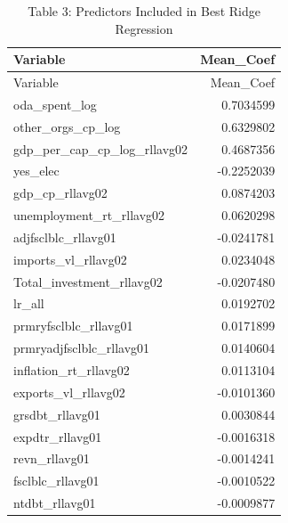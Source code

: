 \documentclass[
]{article}
\begin{document}
\begin{longtable}[]{@{}lr@{}}
\caption{Table 3: Predictors Included in Best Ridge
Regression}\tabularnewline
\toprule\noalign{}
Variable & Mean\_Coef \\
\midrule\noalign{}
\endfirsthead
\toprule\noalign{}
Variable & Mean\_Coef \\
\midrule\noalign{}
\endhead
\bottomrule\noalign{}
\endlastfoot
oda\_spent\_log & 0.7034599 \\
other\_orgs\_cp\_log & 0.6329802 \\
gdp\_per\_cap\_cp\_log\_rllavg02 & 0.4687356 \\
yes\_elec & -0.2252039 \\
gdp\_cp\_rllavg02 & 0.0874203 \\
unemployment\_rt\_rllavg02 & 0.0620298 \\
adjfsclblc\_rllavg01 & -0.0241781 \\
imports\_vl\_rllavg02 & 0.0234048 \\
Total\_investment\_rllavg02 & -0.0207480 \\
lr\_all & 0.0192702 \\
prmryfsclblc\_rllavg01 & 0.0171899 \\
prmryadjfsclblc\_rllavg01 & 0.0140604 \\
inflation\_rt\_rllavg02 & 0.0113104 \\
exports\_vl\_rllavg02 & -0.0101360 \\
grsdbt\_rllavg01 & 0.0030844 \\
expdtr\_rllavg01 & -0.0016318 \\
revn\_rllavg01 & -0.0014241 \\
fsclblc\_rllavg01 & -0.0010522 \\
ntdbt\_rllavg01 & -0.0009877 \\
\end{longtable}
\end{document}
